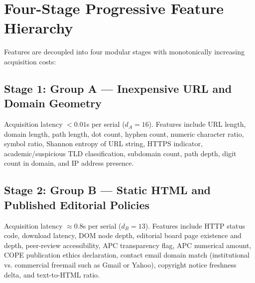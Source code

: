 \documentclass[journal]{IEEEtran}
\begin{document}
\begin{table}[!t]
\centering
\caption{Audited Dataset Cohorts and Partition Architecture}
\label{tab:splits}
\end{table}

\section{Four-Stage Progressive Feature Hierarchy}

Features are decoupled into four modular stages with monotonically increasing acquisition costs:

\subsection{Stage 1: Group A --- Inexpensive URL and Domain Geometry}
Acquisition latency $<0.01$s per serial ($d_A = 16$). Features include URL length, domain length, path length, dot count, hyphen count, numeric character ratio, symbol ratio, Shannon entropy of URL string, HTTPS indicator, academic/suspicious TLD classification, subdomain count, path depth, digit count in domain, and IP address presence.

\subsection{Stage 2: Group B --- Static HTML and Published Editorial Policies}
Acquisition latency $\approx 0.8$s per serial ($d_B = 13$). Features include HTTP status code, download latency, DOM node depth, editorial board page existence and depth, peer-review accessibility, APC transparency flag, APC numerical amount, COPE publication ethics declaration, contact email domain match (institutional vs. commercial freemail such as Gmail or Yahoo), copyright notice freshness delta, and text-to-HTML ratio.
\end{document}
